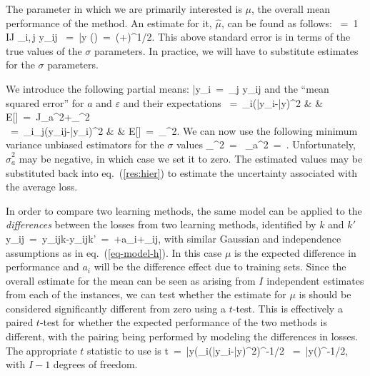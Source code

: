 The parameter in which we are primarily interested is $\mu$, the
overall mean performance of the method.  An estimate for it, $\hat\mu$,
can be found as follows:
%
\beq
\hat\mu\ =\  {1 \over IJ} \sum_{i,\,j} y_{ij} \ =\  \bar y
 \hspace*{2cm}{\rm SD}(\hat\mu)\ =\ 
\Big(+\Big)^{1/2}. 
\label{res:hier}
\eeq
%
This above standard error is in terms of the true values of the
$\sigma$ parameters.  In practice, we will have to substitute estimates
for the $\sigma$ parameters. 

We introduce the following partial means:
%
\beq
\bar y_i\ =\ \sum_j y_{ij}\hspace*{2cm}
\eeq
%
and the ``mean squared error'' for $a$ and $\varepsilon$ and their
expectations
%
\beq
\MSa\ =\ \sum_i(\bar y_i-\bar y)^2 & \hspace{2cm}
& E[\MSa]\ =\ J\sigma_a^2+\sigma_\varepsilon^2\\
\MSe\ =\ \sum_i\sum_j(y_{ij}-\bar y_{i})^2 &
& E[\MSe]\ =\ \sigma_\varepsilon^2.
\eeq
%
We can now use the following minimum variance unbiased estimators for
the $\sigma$ values
%
\beq
\hat\sigma_\varepsilon^2\ =\ \MSe
 \hspace*{2cm} \hat\sigma_a^2\ =\ .
\eeq
%
Unfortunately, $\hat\sigma_a^2$ may be negative, in which case we set
it to zero. The estimated values may be substituted back into
eq.~(\ref{res:hier}) to estimate the uncertainty associated with the
average loss.

In order to compare two learning methods, the same model can be
applied to the \emph{differences} between the losses from two learning
methods, identified by $k$ and $k'$
%
\beq
y_{ij}\ =\ y_{ijk}-y_{ijk'}\ =\ \mu+a_i+\varepsilon_{ij},
\eeq
%
with similar Gaussian and independence assumptions as in
eq.~(\ref{eq-model-h}).  In this case $\mu$ is the expected difference
in performance and $a_i$ will be the difference effect due to training
sets. Since the overall estimate for the mean can be seen as arising
from $I$ independent estimates from each of the instances, we can test
whether the estimate for $\mu$ is should be considered significantly
different from zero using a $t$-test. This is effectively a paired $t$-test
for whether the expected performance of the two methods is different,
with the pairing being performed by modeling the differences in losses. 
The appropriate $t$ statistic to use is
%
\beq
t\ =\ \bar y\Big(\sum_i(\bar y_i-\bar y)^2\Big)^{-1/2}
\ =\ \bar y\Big(\frac{\MSa}{J(I-1)}\Big)^{-1/2},
\eeq
with $I-1$ degrees of freedom.

